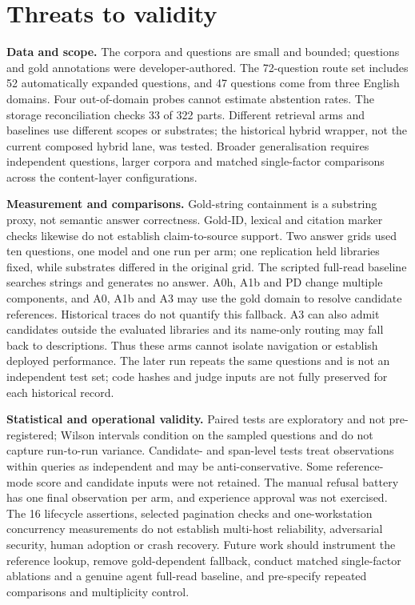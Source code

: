 \section{Threats to validity}
\label{sec:threats}

\noindent\textbf{Data and scope.} The corpora and questions are small and
bounded; questions and gold annotations were developer-authored. The
72-question route set includes 52 automatically expanded questions, and 47
questions come from three English domains. Four out-of-domain probes cannot
estimate abstention rates. The storage reconciliation checks 33 of 322 parts.
Different retrieval arms and baselines use different scopes or substrates;
the historical hybrid wrapper, not the current composed hybrid lane, was
tested. Broader generalisation requires independent questions, larger corpora
and matched single-factor comparisons across the content-layer
configurations.

\noindent\textbf{Measurement and comparisons.} Gold-string containment is a
substring proxy, not semantic answer correctness. Gold-ID, lexical and citation
marker checks likewise do not establish claim-to-source support. Two answer
grids used ten questions, one model and one run per arm; one replication held
libraries fixed, while substrates differed in the original grid. The scripted
full-read baseline searches strings and generates no answer. A0h, A1b and PD
change multiple components, and A0, A1b and A3 may use the gold domain to
resolve candidate references. Historical traces do not quantify this fallback.
A3 can also admit candidates outside the evaluated libraries and its
name-only routing may fall back to descriptions. Thus these arms cannot isolate
navigation or establish deployed performance. The later run repeats the same
questions and is not an independent test set; code hashes and judge inputs are
not fully preserved for each historical record.

\noindent\textbf{Statistical and operational validity.} Paired tests are
exploratory and not pre-registered; Wilson intervals condition on the sampled
questions and do not capture run-to-run variance. Candidate- and span-level
tests treat observations within queries as independent and may be
anti-conservative. Some reference-mode score and candidate inputs were not
retained. The manual refusal battery has one final observation per arm, and
experience approval was not exercised. The 16 lifecycle assertions, selected
pagination checks and one-workstation concurrency measurements do not establish
multi-host reliability, adversarial security, human adoption or crash recovery.
Future work should instrument the reference lookup, remove gold-dependent
fallback, conduct matched single-factor ablations and a genuine agent full-read
baseline, and pre-specify repeated comparisons and multiplicity control.
